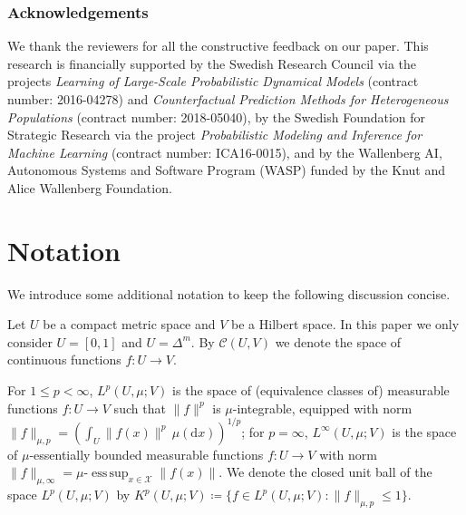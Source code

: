 \documentclass{article}
\DeclareMathOperator*{\esssup}{ess\,sup}
\begin{document}
\subsubsection*{Acknowledgements}

We thank the reviewers for all the constructive feedback on our paper.
This research is financially supported by the Swedish Research Council via the
projects \emph{Learning of Large-Scale Probabilistic Dynamical Models} (contract
number: 2016-04278) and \emph{Counterfactual Prediction Methods for Heterogeneous
  Populations} (contract number: 2018-05040), by the Swedish Foundation for
Strategic Research via the project \emph{Probabilistic Modeling and Inference
  for Machine Learning} (contract number: ICA16-0015), and by the Wallenberg AI,
Autonomous Systems and Software Program (WASP) funded by the Knut and Alice
Wallenberg Foundation.




\clearpage

\appendix
{}
\renewcommand*{\thetheorem}{\thesection.\arabic{theorem}}
\renewcommand*{\thelemma}{\thesection.\arabic{lemma}}
\renewcommand*{\theproposition}{\thesection.\arabic{proposition}}
\renewcommand*{\thecorollary}{\thesection.\arabic{corollary}}
\renewcommand*{\thedefinition}{\thesection.\arabic{definition}}
\renewcommand*{\theexample}{\thesection.\arabic{example}}
\renewcommand*{\theremark}{\thesection.\arabic{remark}}
\makeatletter
{}
\makeatother

\section{Notation}

We introduce some additional notation to keep the following discussion concise.

Let $U$ be a compact metric space and $V$ be a Hilbert space. In this paper we
only consider $U = [0,1]$ and $U = \Delta^m$. By $\mathcal{C}(U, V)$ we denote
the space of continuous functions $f \colon U \to V$.

For $1 \leq p < \infty$, $L^p(U, \mu; V)$ is the space of (equivalence classes
of) measurable functions $f \colon U \to V$ such that $\|f\|^p$ is
$\mu$-integrable, equipped with norm
$\|f\|_{\mu,p} = {(\int_{U} \|f(x)\|^p \,\mu(\mathrm{d}x))}^{1/p}$; for
$p = \infty$, $L^{\infty}(U, \mu; V)$ is the space of $\mu$-essentially bounded
measurable functions $f \colon U \to V$ with norm
$\|f\|_{\mu,\infty} = \mu\text{-}\esssup_{x \in \mathcal{X}} \|f(x)\|$. We denote the
closed unit ball of the space $L^p(U, \mu; V)$ by
$K^p(U, \mu; V) \coloneqq \{f \in L^p(U, \mu; V) \colon \|f\|_{\mu,p} \leq 1\}$.
\end{document}
